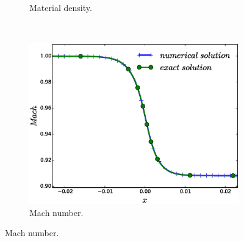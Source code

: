 \documentclass[times,doublespace]{fldauth}%
\begin{document}
\begin{figure}[h]
\begin{subfigure}{0.32\textwidth}
    \caption{Material density.}\label{fig:mach-1p05-cst-xs-density}
    \end{subfigure}
    ~
    \begin{subfigure}{0.32\textwidth}
    \centering
    \includegraphics[width=\linewidth]{figures/cst-xs/mach-1p05/mass-diff-mach-1p05-mach-number-nel-250-plot.eps}
    \caption{Mach number.}\label{fig:mach-1p05-cst-xs-mach}
    \end{subfigure}


\end{figure}
\end{document}
